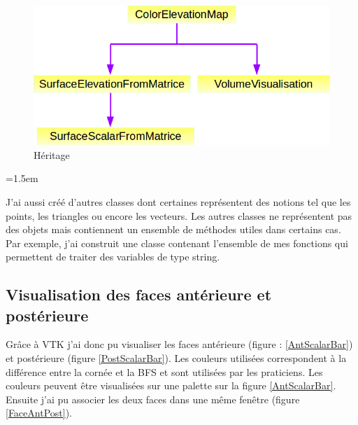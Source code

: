 \documentclass[a4paper,12pt]{article}
\begin{document}


\begin{figure}[h!]
	\centering
	\includegraphics[width=15cm]{heritage.png} 
	\caption{Héritage}
\end{figure}



\vspace{0.25cm}
\parindent=1.5em

 J'ai aussi créé d'autres classes dont certaines représentent des notions tel que les points, les triangles ou encore les vecteurs. Les autres classes ne représentent pas des objets mais contiennent un ensemble de méthodes utiles dans certains cas. Par exemple, j'ai construit une classe contenant l'ensemble de mes fonctions qui permettent de traiter des variables de type string.
 
	\subsection{Visualisation des faces antérieure et postérieure}
	Grâce à VTK j'ai donc pu visualiser les faces antérieure (figure : \ref{AntScalarBar}) et postérieure (figure \ref{PostScalarBar}). Les couleurs utilisées correspondent à la différence entre la cornée et la BFS et sont utilisées par les praticiens. Les couleurs peuvent \^etre visualisées sur une palette sur la figure \ref{AntScalarBar}. Ensuite j'ai pu associer les deux faces dans une m\^eme fen\^etre (figure \ref{FaceAntPost}).
	
\end{document}
